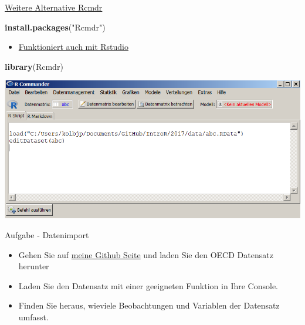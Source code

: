\documentclass[
  ignorenonframetext,
]{beamer}
\newenvironment{Shaded}{\begin{snugshade}}{\end{snugshade}}
\newcommand{\KeywordTok}[1]{\textcolor[rgb]{0.26,0.66,0.93}{\textbf{#1}}}
\newcommand{\NormalTok}[1]{\textcolor[rgb]{0.74,0.68,0.62}{#1}}
\newcommand{\StringTok}[1]{\textcolor[rgb]{0.02,0.61,0.04}{#1}}
\providecommand{\tightlist}{%
  \setlength{\itemsep}{0pt}\setlength{\parskip}{0pt}}
\begin{document}
\begin{frame}[fragile]{\href{https://cran.r-project.org/web/packages/Rcmdr/index.html}{Weitere
Alternative Rcmdr}}
\protect\hypertarget{weitere-alternative-rcmdr}{}

\begin{Shaded}
\begin{Highlighting}[]
\KeywordTok{install.packages}\NormalTok{(}\StringTok{"Rcmdr"}\NormalTok{)}
\end{Highlighting}
\end{Shaded}

\begin{itemize}
\tightlist
\item
  \href{http://www.rcommander.com/}{Funktioniert auch mit Rstudio}
\end{itemize}

\begin{Shaded}
\begin{Highlighting}[]
\KeywordTok{library}\NormalTok{(Rcmdr)}
\end{Highlighting}
\end{Shaded}

\includegraphics{figure/Rcommander.PNG}

\end{frame}

\begin{frame}{Aufgabe - Datenimport}
\protect\hypertarget{aufgabe---datenimport}{}

\begin{itemize}
\item
  Gehen Sie auf
  \href{https://github.com/Japhilko/IntroR/blob/master/2017/data/oecd.dta?raw=true}{meine
  Github Seite} und laden Sie den OECD Datensatz herunter
\item
  Laden Sie den Datensatz mit einer geeigneten Funktion in Ihre Console.
\item
  Finden Sie heraus, wieviele Beobachtungen und Variablen der Datensatz
  umfasst.
\end{itemize}

\end{frame}
\end{document}
